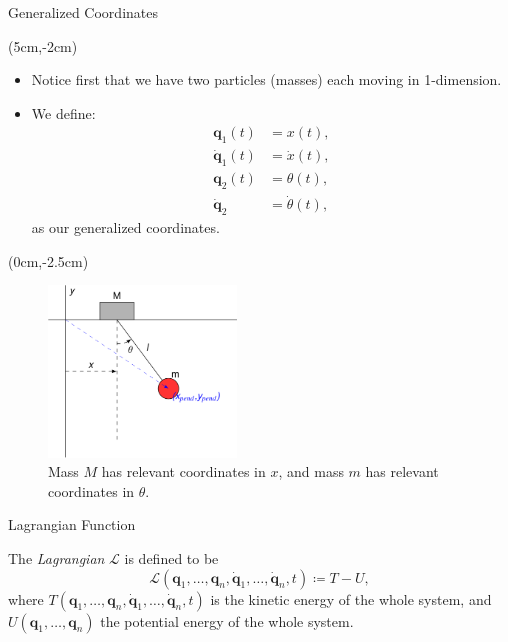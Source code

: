 \documentclass[usenames,dvipsnames]{beamer}
\theoremstyle{definition}
\theoremstyle{theorem}
\begin{document}
        \begin{frame}{Generalized Coordinates}
            \begin{textblock*}{6cm}(5cm,-2cm)
            \begin{itemize}
                \item Notice first that we have two particles (masses) each moving in 1-dimension.
                \item We define:
                    \begin{align*}
                        \mathbf{q}_1(t)&=x(t),\\
                        \mathbf{\dot{q}}_1(t)&=\dot{x}(t),\\
                        \mathbf{q}_2(t)&=\theta(t),\\
                        \dot{\mathbf{q}}_2&=\dot{\theta}(t),
                    \end{align*}
                    as our generalized coordinates.
            \end{itemize}
            \end{textblock*}
            \begin{textblock*}{5cm}(0cm,-2.5cm)
            \begin{figure}
                \centering
                \includegraphics[width=5cm]{Lagrangian_Mechanics/generalized_coordinates.png}
                \caption{Mass $M$ has relevant coordinates in $x$, and mass $m$ has relevant coordinates in $\theta$.}
                \label{fig:my_label}
            \end{figure}
            \end{textblock*}
        \end{frame}
        
        \begin{frame}{Lagrangian Function}
            \begin{definition}
                The \emph{Lagrangian} $\mathcal{L}$ is defined to be
                \[
                \mathcal{L}(\mathbf{q}_1,\dots,\mathbf{q}_n,\mathbf{\dot{q}}_1,\dots,\mathbf{\dot{q}}_n,t)\coloneqq T-U,
                \]
                where $T(\mathbf{q}_1,\dots,\mathbf{q}_n,\mathbf{\dot{q}}_1,\dots,\mathbf{\dot{q}}_n,t)$ is the kinetic energy of the whole system, and $U(\mathbf{q}_1,\dots,\mathbf{q}_n)$ the potential energy of the whole system.
            \end{definition}
        \end{frame}
        
\end{document}

